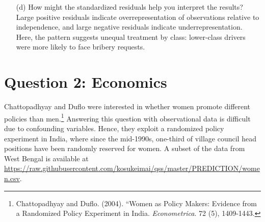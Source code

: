 \documentclass[12pt,letterpaper]{article}
\begin{document}
\begin{enumerate}
		\noindent Residuals exceeding $\pm 2$ indicate unusually large deviations.
		
		\vspace{0.2cm}
		The “Lower–Bribe Requested” cell shows a positive residual (+1.64). Lower-class drivers were asked for bribes more frequently than expected, suggesting that police officers may have shown some bias against lower-class drivers. In contrast, upper-class drivers were relatively less likely to be asked for bribes, consistent with unequal enforcement patterns.
		
		\vspace{0.4cm}
		
		\item[(d)] How might the standardized residuals help you interpret the results?\\
		Large positive residuals indicate overrepresentation of observations relative to independence, and large negative residuals indicate underrepresentation.  
		Here, the pattern suggests unequal treatment by class: lower-class drivers were more likely to face bribery requests.
	\end{enumerate}
	
	\newpage
	\section*{Question 2: Economics}
	
	Chattopadhyay and Duflo were interested in whether women promote different policies than men.\footnote{Chattopadhyay and Duflo. (2004). ``Women as Policy Makers: Evidence from a Randomized Policy Experiment in India. \textit{Econometrica}. 72 (5), 1409-1443.} 
	Answering this question with observational data is difficult due to confounding variables. Hence, they exploit a randomized policy experiment in India, where since the mid-1990s, one-third of village council head positions have been randomly reserved for women. 
	A subset of the data from West Bengal is available at \url{https://raw.githubusercontent.com/kosukeimai/qss/master/PREDICTION/women.csv}.
	
\end{document}
